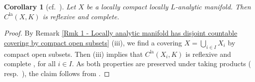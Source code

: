 \documentclass[a4paper, reqno, 10pt]{amsart}
\newtheorem{corollary}[theorem]{Corollary}
\theoremstyle{definition}
\numberwithin{equation}{section}
\newcommand{\la}{{\mathrm{la}}}
\begin{document}
\begin{corollary}[{cf.\ \cite[p.\ 40]{Emerton17LocAnVect}}]\label{Cor 1 - Space of K-valued locally analytic functions is reflexive and barrelled}
	Let $X$ be a locally compact locally $L$-analytic manifold.
	Then $C^\la(X,K)$ is reflexive and complete.
\end{corollary}
\begin{proof}
	By Remark \ref{Rmk 1 - Locally analytic manifold has disjoint countable covering by compact open subsets} (iii), we find a covering $X = \bigcup_{i\in I} X_i$ by compact open subsets.
	Then  (iii) implies that $C^\la(X_i,K)$ is reflexive and complete \cite[Prop.\ 16.10]{Schneider02NonArchFunctAna}, for all $i\in I$.
	As both properties are preserved under taking products (\cite[Prop.\ 9.10 and 9.11]{Schneider02NonArchFunctAna} resp.\ \cite[Comment before Lemma 7.8]{Schneider02NonArchFunctAna}), the claim follows from .
\end{proof}
\end{document}
